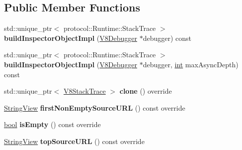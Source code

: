 \subsection*{Public Member Functions}
\begin{DoxyCompactItemize}
\item 
\mbox{\label{classv8__inspector_1_1V8StackTraceImpl_a1a6b6d5c9583d12cffdedd277dcf1a17}} 
std\+::unique\+\_\+ptr$<$ protocol\+::\+Runtime\+::\+Stack\+Trace $>$ {\bfseries build\+Inspector\+Object\+Impl} (\mbox{\hyperlink{classv8__inspector_1_1V8Debugger}{V8\+Debugger}} $\ast$debugger) const
\item 
\mbox{\label{classv8__inspector_1_1V8StackTraceImpl_a7da49cbf980ef46791dd083c5405c45f}} 
std\+::unique\+\_\+ptr$<$ protocol\+::\+Runtime\+::\+Stack\+Trace $>$ {\bfseries build\+Inspector\+Object\+Impl} (\mbox{\hyperlink{classv8__inspector_1_1V8Debugger}{V8\+Debugger}} $\ast$debugger, \mbox{\hyperlink{classint}{int}} max\+Async\+Depth) const
\item 
\mbox{\label{classv8__inspector_1_1V8StackTraceImpl_ac9e8e4fbf1322d007eaee818d1ba8cbd}} 
std\+::unique\+\_\+ptr$<$ \mbox{\hyperlink{classv8__inspector_1_1V8StackTrace}{V8\+Stack\+Trace}} $>$ {\bfseries clone} () override
\item 
\mbox{\label{classv8__inspector_1_1V8StackTraceImpl_a171aa208cb6a2a7779e7fd8ecd50213e}} 
\mbox{\hyperlink{classv8__inspector_1_1StringView}{String\+View}} {\bfseries first\+Non\+Empty\+Source\+U\+RL} () const override
\item 
\mbox{\label{classv8__inspector_1_1V8StackTraceImpl_a61b5fee9032b9545dabda103fa0e9eef}} 
\mbox{\hyperlink{classbool}{bool}} {\bfseries is\+Empty} () const override
\item 
\mbox{\label{classv8__inspector_1_1V8StackTraceImpl_a787b7b2badc9deef82b0b818a183fd44}} 
\mbox{\hyperlink{classv8__inspector_1_1StringView}{String\+View}} {\bfseries top\+Source\+U\+RL} () const override
\item 
\mbox{\label{classv8__inspector_1_1V8StackTraceImpl_ade598a87bddf42f072ffbffab0954cf8}} 

\end{DoxyCompactItemize}
